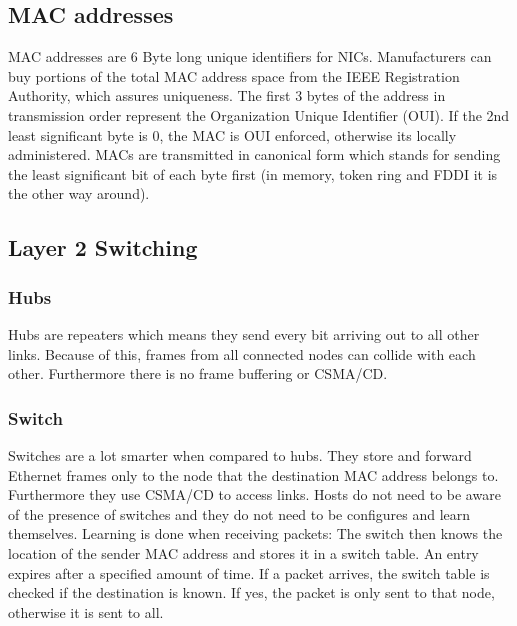 \subsection{MAC addresses}
MAC addresses are 6 Byte long unique identifiers for NICs.
Manufacturers can buy portions of the total MAC address space from the IEEE Registration Authority, which assures uniqueness.
The first 3 bytes of the address in transmission order represent the Organization Unique Identifier (OUI).
If the 2nd least significant byte is 0, the MAC is OUI enforced, otherwise its locally administered.
MACs are transmitted in canonical form which stands for sending the least significant bit of each byte first (in memory, token ring and FDDI it is the other way around).

\subsection{Layer 2 Switching}
\subsubsection*{Hubs}
Hubs are repeaters which means they send every bit arriving out to all other links.
Because of this, frames from all connected nodes can collide with each other.
Furthermore there is no frame buffering or CSMA/CD.

\subsubsection*{Switch}
Switches are a lot smarter when compared to hubs.
They store and forward Ethernet frames only to the node that the destination MAC address belongs to.
Furthermore they use CSMA/CD to access links.
Hosts do not need to be aware of the presence of switches and they do not need to be configures and learn themselves.
Learning is done when receiving packets: The switch then knows the location of the sender MAC address and stores it in a switch table.
An entry expires after a specified amount of time.
If a packet arrives, the switch table is checked if the destination is known.
If yes, the packet is only sent to that node, otherwise it is sent to all.

